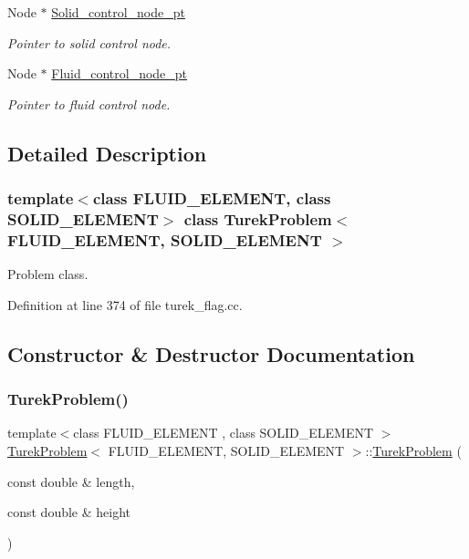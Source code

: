 \begin{DoxyCompactItemize}
Node $\ast$ \hyperlink{classTurekProblem_ad65b9a2f833ed9bae3520980c76d1f2f}{Solid\+\_\+control\+\_\+node\+\_\+pt}
\begin{DoxyCompactList}\small\item\em Pointer to solid control node. \end{DoxyCompactList}\item 
Node $\ast$ \hyperlink{classTurekProblem_a3d297a52fffd79bb7083fd57c2574fff}{Fluid\+\_\+control\+\_\+node\+\_\+pt}
\begin{DoxyCompactList}\small\item\em Pointer to fluid control node. \end{DoxyCompactList}\end{DoxyCompactItemize}


\subsection{Detailed Description}
\subsubsection*{template$<$class F\+L\+U\+I\+D\+\_\+\+E\+L\+E\+M\+E\+NT, class S\+O\+L\+I\+D\+\_\+\+E\+L\+E\+M\+E\+NT$>$\newline
class Turek\+Problem$<$ F\+L\+U\+I\+D\+\_\+\+E\+L\+E\+M\+E\+N\+T, S\+O\+L\+I\+D\+\_\+\+E\+L\+E\+M\+E\+N\+T $>$}

Problem class. 

Definition at line 374 of file turek\+\_\+flag.\+cc.



\subsection{Constructor \& Destructor Documentation}
\mbox{\label{classTurekProblem_a69f6624fd854393f0c0e5303603ec749}} 
\subsubsection{\texorpdfstring{Turek\+Problem()}{TurekProblem()}}
{\footnotesize\ttfamily template$<$class F\+L\+U\+I\+D\+\_\+\+E\+L\+E\+M\+E\+NT , class S\+O\+L\+I\+D\+\_\+\+E\+L\+E\+M\+E\+NT $>$ \\
\hyperlink{classTurekProblem}{Turek\+Problem}$<$ F\+L\+U\+I\+D\+\_\+\+E\+L\+E\+M\+E\+NT, S\+O\+L\+I\+D\+\_\+\+E\+L\+E\+M\+E\+NT $>$\+::\hyperlink{classTurekProblem}{Turek\+Problem} (\begin{DoxyParamCaption}\item[{const double \&}]{length,  }\item[{const double \&}]{height }\end{DoxyParamCaption})}



